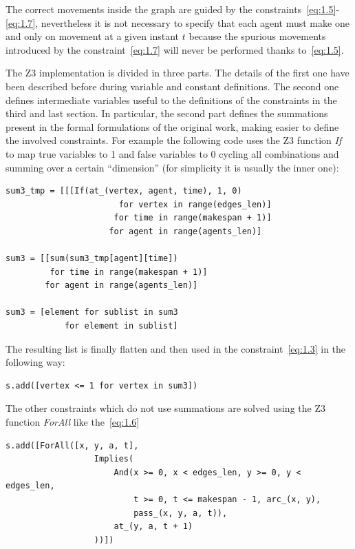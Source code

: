 \documentclass[12pt, a4paper, hidelinks]{article}
\numberwithin{equation}{section}
\begin{document}
The correct movements inside the graph are guided by the constraints~\ref{eq:1.5}-\ref{eq:1.7}, nevertheless it is not necessary to specify that each agent must make one and only on movement at a given instant $t$ because the spurious movements introduced by the constraint~\ref{eq:1.7} will never be performed thanks to~\ref{eq:1.5}.

The Z3 implementation is divided in three parts.
The details of the first one have been described before during variable and constant definitions. 
The second one defines intermediate variables useful to the definitions of the constraints in the third and last section.
In particular, the second part defines the summations present in the formal formulations of the original work, making easier to define the involved constraints.
For example the following code uses the Z3 function \textit{If} to map true variables to 1 and false variables to 0 cycling all combinations and summing over a certain ``dimension'' (for simplicity it is usually the inner one):

\begin{lstlisting}[label={lst:1.3.1}]
sum3_tmp = [[[If(at_(vertex, agent, time), 1, 0)
                       for vertex in range(edges_len)]
                      for time in range(makespan + 1)]
                     for agent in range(agents_len)]

sum3 = [[sum(sum3_tmp[agent][time])
         for time in range(makespan + 1)]
        for agent in range(agents_len)]

sum3 = [element for sublist in sum3 
            for element in sublist]
\end{lstlisting}

The resulting list is finally flatten and then used in the constraint~\ref{eq:1.3} in the following way:

\begin{lstlisting}[label={lst:1.3.2}]
s.add([vertex <= 1 for vertex in sum3])
\end{lstlisting}

The other constraints which do not use summations are solved using the Z3 function \textit{ForAll} like the~\ref{eq:1.6}

\begin{lstlisting}[label={lst:1.6}]
s.add([ForAll([x, y, a, t],
                  Implies(
                      And(x >= 0, x < edges_len, y >= 0, y < edges_len,
                          t >= 0, t <= makespan - 1, arc_(x, y),
                          pass_(x, y, a, t)),
                      at_(y, a, t + 1)
                  ))])
\end{lstlisting}
\end{document}
